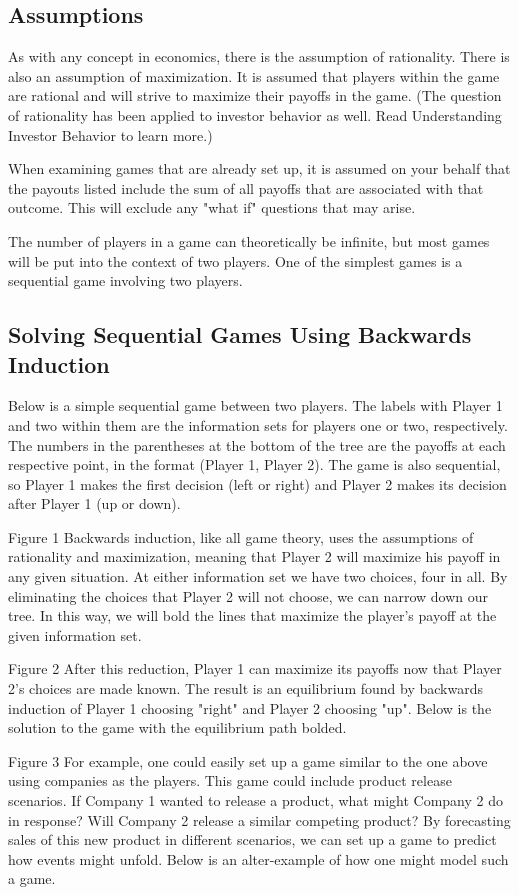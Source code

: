 \subsection{Assumptions}
As with any concept in economics, there is the assumption of rationality. There is also an assumption of maximization. It is assumed that players within the game are rational and will strive to maximize their payoffs in the game. (The question of rationality has been applied to investor behavior as well. Read Understanding Investor Behavior to learn more.)

When examining games that are already set up, it is assumed on your behalf that the payouts listed include the sum of all payoffs that are associated with that outcome. This will exclude any "what if" questions that may arise.

The number of players in a game can theoretically be infinite, but most games will be put into the context of two players. One of the simplest games is a sequential game involving two players.

\subsection{Solving Sequential Games Using Backwards Induction}
Below is a simple sequential game between two players. The labels with Player 1 and two within them are the information sets for players one or two, respectively. The numbers in the parentheses at the bottom of the tree are the payoffs at each respective point, in the format (Player 1, Player 2). The game is also sequential, so Player 1 makes the first decision (left or right) and Player 2 makes its decision after Player 1 (up or down).


Figure 1
Backwards induction, like all game theory, uses the assumptions of rationality and maximization, meaning that Player 2 will maximize his payoff in any given situation. At either information set we have two choices, four in all. By eliminating the choices that Player 2 will not choose, we can narrow down our tree. In this way, we will bold the lines that maximize the player's payoff at the given information set.


Figure 2
After this reduction, Player 1 can maximize its payoffs now that Player 2's choices are made known. The result is an equilibrium found by backwards induction of Player 1 choosing "right" and Player 2 choosing "up". Below is the solution to the game with the equilibrium path bolded.


Figure 3
For example, one could easily set up a game similar to the one above using companies as the players. This game could include product release scenarios. If Company 1 wanted to release a product, what might Company 2 do in response? Will Company 2 release a similar competing product? By forecasting sales of this new product in different scenarios, we can set up a game to predict how events might unfold. Below is an alter-example of how one might model such a game.



